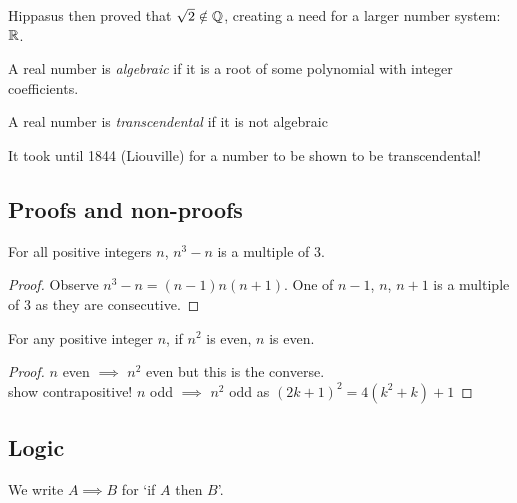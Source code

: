 \documentclass{../template/note}
\begin{document}
    Hippasus then proved that \(\sqrt 2 \notin \mathbb Q\), creating a need for a larger number system: \(\mathbb R\).

    \begin{definition}
        A real number is \emph{algebraic} if it is a root of some polynomial with integer coefficients.
    \end{definition}

    \begin{definition}
        A real number is \emph{transcendental} if it is not algebraic
    \end{definition}

    \begin{remark*}
        It took until 1844 (Liouville) for a number to be shown to be transcendental!
    \end{remark*}

    \subsection{Proofs and non-proofs}

    \begin{claim}
        For all positive integers \(n\), \(n^3-n\) is a multiple of 3.
    \end{claim}
    
    \begin{proof}
        Observe \(n^3-n=(n-1)n(n+1)\). One of \(n-1\), \(n\), \(n+1\) is a multiple of 3 as they are consecutive.
    \end{proof}
    
    \begin{claim}
        For any positive integer \(n\), if \(n^2\) is even, \(n\) is even.
    \end{claim}
    
    \begin{proof}
        \(n\) even \(\implies\) \(n^2\) even but this is the converse. \\
        show contrapositive! \(n\) odd \(\implies\) \(n^2\) odd as \((2k+1)^2 = 4(k^2+k)+1\)
    \end{proof}


    \subsection{Logic}

    We write \(A \implies B\) for `if \(A\) then \(B\)'.
\end{document}
